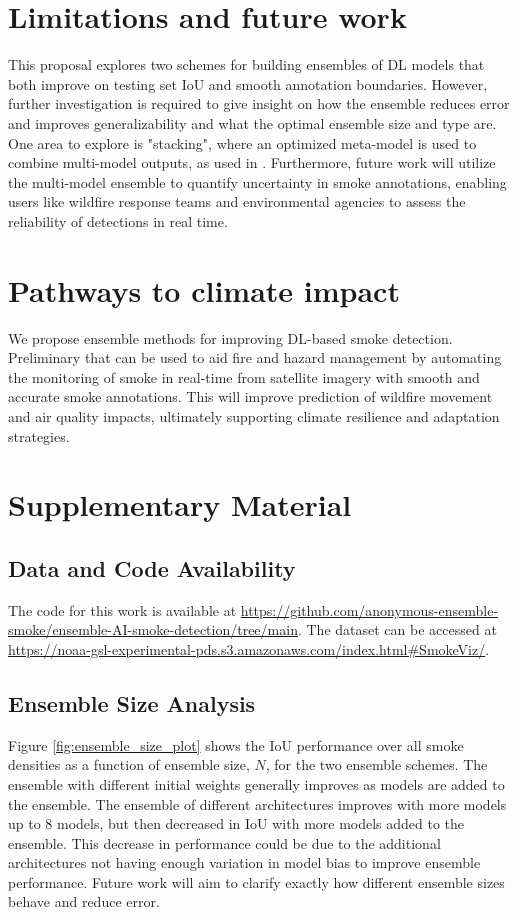 \documentclass{article}
\begin{document}
\section{Limitations and future work} This proposal explores two schemes for building ensembles of DL models that both improve on testing set IoU and smooth annotation boundaries. However, further investigation is required to give insight on how the ensemble reduces error and improves generalizability and what the optimal ensemble size and type are. One area to explore is "stacking", where an optimized meta-model is used to combine multi-model outputs, as used in \cite{stacking-smoke-falcao, pm2.5-stack, rainfall-stack}. Furthermore, future work will utilize the multi-model ensemble to quantify uncertainty in smoke annotations, enabling users like wildfire response teams and environmental agencies to assess the reliability of detections in real time. 

\section{Pathways to climate impact} We propose ensemble methods for improving DL-based smoke detection. Preliminary that can be used to aid fire and hazard management by automating the monitoring of smoke in real-time from satellite imagery with smooth and accurate smoke annotations. This will improve prediction of wildfire movement and air quality impacts, ultimately supporting climate resilience and adaptation strategies.  

\newpage

 

\section{Supplementary Material}
\subsection{Data and Code Availability}\label{sec:data-code} The code for this work is available at \url{https://github.com/anonymous-ensemble-smoke/ensemble-AI-smoke-detection/tree/main}. The dataset can be accessed at \url{https://noaa-gsl-experimental-pds.s3.amazonaws.com/index.html#SmokeViz/}.

\subsection{Ensemble Size Analysis}\label{sec:ens-size} 
Figure \ref{fig:ensemble_size_plot} shows the IoU performance over all smoke densities as a function of ensemble size, $N$, for the two ensemble schemes. The ensemble with different initial weights generally improves as models are added to the ensemble. The ensemble of different architectures improves with more models up to 8 models, but then decreased in IoU with more models added to the ensemble. This decrease in performance could be due to the additional architectures not having enough variation in model bias to improve ensemble performance. Future work will aim to clarify exactly how different ensemble sizes behave and reduce error. 
\end{document}
